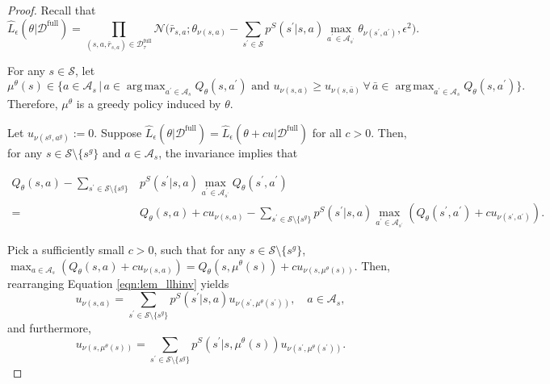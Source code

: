 \documentclass{amsart}
\DeclareMathOperator*{\argmax}{arg\,max}
\begin{document}
\begin{proof}
    Recall that 
    $$\hat{L}_\epsilon(\theta|\mathcal{D}^{\mathrm{full}}) = \prod_{(s,a,\bar{r}_{s,a}) \in \mathcal{D}_\tau^{\mathrm{full}}} \mathcal{N}\Big(\bar{r}_{s,a};\theta_{\nu(s,a)} - \sum_{s^\prime \in \mathcal{S}} p^S(s^\prime|s,a) \max_{a^\prime \in \mathcal{A}_{s^\prime}} \theta_{\nu(s^\prime,a^\prime)}, \epsilon^2\Big).$$

    For any $s \in \mathcal{S}$, let 
    $$\mu^\theta(s) \in \Big\{a \in \mathcal{A}_s \, \Big| \, a \in \argmax_{a^\prime \in \mathcal{A}_{s}}Q_\theta(s,a^\prime) \text{ and } u_{\nu(s,a)} \geq u_{\nu(s,\bar{a})} \, \forall \, \bar{a} \in \argmax_{a^\prime \in \mathcal{A}_s} Q_\theta(s,a^\prime)\Big\}.$$
    Therefore, $\mu^\theta$ is a greedy policy induced by $\theta$.


    Let $u_{\nu(s^g,a^g)}:= 0$. Suppose $\hat{L}_\epsilon(\theta |\mathcal{D}^{\mathrm{full}}) = \hat{L}_\epsilon(\theta+cu|\mathcal{D}^{\mathrm{full}})$ for all $c>0$.  Then, for any $s \in \mathcal{S} \setminus \{s^g\}$ and $a \in \mathcal{A}_s$, the invariance implies that

    \begin{align}
    Q_\theta(s,a) - \sum_{s^\prime \in \mathcal{S} \setminus \{s^g\}} &p^S(s^\prime|s,a) \max_{a^\prime \in \mathcal{A}_{s^\prime}} Q_\theta(s^\prime,a^\prime) \nonumber \\
    =& Q_\theta(s,a) + cu_{\nu(s,a)} -\sum_{s^\prime \in \mathcal{S} \setminus \{s^g\}} p^S(s^\prime|s,a) \max_{a^\prime \in \mathcal{A}_{s^\prime}} (Q_\theta(s^\prime,a^\prime)+cu_{\nu(s^\prime,a^\prime)}). \label{eqn:lem_llhinv}
\end{align}

Pick a sufficiently small $c>0$, such that for any $s \in \mathcal{S} \setminus \{ s^g\}$, $\max_{a \in \mathcal{A}_{s}} (Q_\theta(s,a)+cu_{\nu(s,a)}) = Q_\theta(s,\mu^\theta(s)) + cu_{\nu(s,\mu^\theta(s))}$. Then, rearranging Equation \ref{eqn:lem_llhinv} yields
\begin{equation}
u_{\nu(s,a)} = \sum_{s^\prime \in \mathcal{S} \setminus \{s^g\}} p^S(s^\prime|s,a) u_{\nu(s^\prime,\mu^\theta(s^\prime))}, \quad a \in \mathcal{A}_s, \label{eqn:lem:propernou_eq1}
\end{equation}
and furthermore,
\begin{equation}
u_{\nu(s,\mu^\theta(s))} = \sum_{s^\prime \in \mathcal{S} \setminus \{s^g\}} p^S(s^\prime|s,\mu^\theta(s)) u_{\nu(s^\prime,\mu^\theta(s^\prime))}. \label{eqn:lem:propernou_eq2}
\end{equation}


\end{proof}
\end{document}

